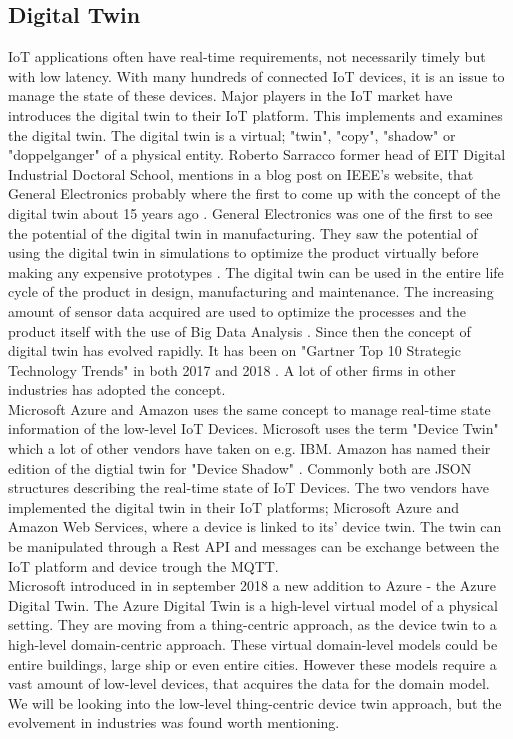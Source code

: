 \subsection{Digital Twin}
IoT applications often have real-time requirements, not necessarily timely but with low latency. With many hundreds of connected IoT devices, it is an issue to manage the state of these devices. Major players in the IoT market have introduces the digital twin to their IoT platform. This implements and examines the digital twin. The digital twin is a virtual; "twin", "copy", "shadow" or "doppelganger" of a physical entity. Roberto Sarracco former head of EIT Digital Industrial Doctoral School, mentions in a blog post on IEEE's website, that General Electronics probably where the first to come up with the concept of the digital twin about 15 years ago \cite{IEEE}.
General Electronics was one of the first to see the potential of the digital twin in manufacturing. They saw the potential of using the digital twin in simulations to optimize the product virtually before making any expensive prototypes \cite{GE}. The digital twin can be used in the entire life cycle of the product in design, manufacturing and maintenance. The increasing amount of sensor data acquired are used to optimize the processes and the product itself with the use of Big Data Analysis \cite{8477101}. Since then the concept of digital twin has evolved rapidly. It has been on "Gartner Top 10 Strategic Technology Trends" in both 2017 and 2018 \cite{Gartner}. A lot of other firms in other industries has adopted the concept. \\

Microsoft Azure and Amazon uses the same concept to manage real-time state information of the low-level IoT Devices. Microsoft uses the term "Device Twin" \cite{MS} which a lot of other vendors have taken on e.g. IBM. Amazon has named their edition of the digtial twin for "Device Shadow" \cite{Amazon}. Commonly both are JSON structures describing the real-time state of IoT Devices. The two vendors have implemented the digital twin in their IoT platforms; Microsoft Azure and Amazon Web Services, where a device is linked to its' device twin. The twin can be manipulated through a Rest API and messages can be exchange between the IoT platform and device trough the MQTT. \\

Microsoft introduced in \cite{azuredigitaltwin} in september 2018 a new addition to Azure - the Azure Digital Twin. The Azure Digital Twin is a high-level virtual model of a physical setting. They are moving from a thing-centric approach, as the device twin to a high-level domain-centric approach. These virtual domain-level models could be entire buildings, large ship or even entire cities. However these models require a vast amount of low-level devices, that acquires the data for the domain model. We will be looking into the low-level thing-centric device twin approach, but the evolvement in industries was found worth mentioning. 